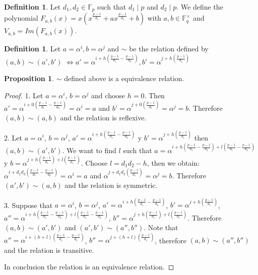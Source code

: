 \documentclass{article}
\theoremstyle{definition}
\newtheorem{definition}[theorem]{Definition}
\newtheorem{prop}[theorem]{Proposition}
\theoremstyle{remark}
\numberwithin{equation}{section}
\begin{document}
\begin{definition}
  Let $d_1, d_2 \in \mathbb{F}_p$ such that $d_1 \mid p$ and $d_2 \mid p$. We define the polynomial $F_{a,b}(x) = x(x^{\frac{p-1}{d_1}} + ax^{\frac{p-1}{d_2}} +b)$ with $a,b \in \mathbb{F}_q^{\times}$ and $V_{a,b} = Im(F_{a,b}(x))$.
\end{definition}

\begin{definition}

  Let $a = \alpha^i, b = \alpha^j$ and $\sim$ be the relation defined by $(a,b) \sim (a', b')$ 
  $\Longleftrightarrow a' = \alpha^{i+h(\frac{p-1}{d_1} - \frac{p-1}{d_2})}, b' = \alpha^{j+h(\frac{p-1}{d_1})}$

\end{definition}

\begin{prop}
  
  $\sim$ defined above is a equivalence relation.

\end{prop}

\begin{proof}
  
  1. Let $a=\alpha^i$, $b=\alpha^j$ and choose $h=0$. Then $a' = \alpha^{i+0(\frac{p-1}{d_1}-\frac{p-1}{d_2})} = \alpha^i = a$ and $b' = \alpha^{j+0(\frac{p-1}{d_1})} = \alpha^j = b$. Therefore $(a,b) \sim (a,b)$ and the relation is reflexive.

  2. Let $a = \alpha^i$, $b=\alpha^j$, $a' = \alpha^{i+h(\frac{p-1}{d_1}-\frac{p-1}{d_2})}$ y $b' = \alpha^{j+h(\frac{p-1}{d_1})}$ then $(a,b) \sim (a',b')$. We want to find $l$ such that $a = \alpha^{i+h(\frac{p-1}{d_1}-\frac{p-1}{d_2})+l(\frac{p-1}{d_1}-\frac{p-1}{d_2})}$ y $b = \alpha^{j+h(\frac{p-1}{d_1})+l(\frac{p-1}{d_1})}$. Choose $l=d_1d_2-h$, then we obtain: $\alpha^{i+d_1d_2(\frac{p-1}{d_1}-\frac{p-1}{d_2})} = \alpha^i = a$ and $\alpha^{j+d_1d_2(\frac{p-1}{d_1})} = \alpha^j = b$. Therefore $(a',b') \sim (a,b) $ and the relation is symmetric.

  3. Suppose that $a = \alpha^i$, $b=\alpha^j$, $a' = \alpha^{i+h(\frac{p-1}{d_1}-\frac{p-1}{d_2})}$, $b' = \alpha^{j+h(\frac{p-1}{d_1})}$, $a'' = \alpha^{i+h(\frac{p-1}{d_1}-\frac{p-1}{d_2})+l(\frac{p-1}{d_1}-\frac{p-1}{d_2})}$, $b'' = \alpha^{j+h(\frac{p-1}{d_1})+l(\frac{p-1}{d_1})}$. Therefore $(a,b) \sim (a',b')$ and $(a',b') \sim (a'',b'')$. Note that $a'' = \alpha^{i+(h+l)(\frac{p-1}{d_1}-\frac{p-1}{d_2})}$, $b'' = \alpha^{j+(h+l)(\frac{p-1}{d_1})}$, therefore $(a,b) \sim (a'',b'')$ and the relation is transitive.

  In conclusion the relation is an equivalence relation.

\end{proof}
\end{document}
